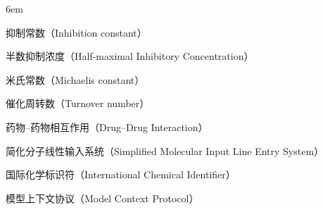 \begin{notation}
\begin{notationlist}{6em}
    \item[$K_i$] 抑制常数（Inhibition constant）
    \item[$\mathrm{IC}_{50}$] 半数抑制浓度（Half-maximal Inhibitory Concentration）
    \item[$K_m$] 米氏常数（Michaelis constant）
    \item[$k_{\mathrm{cat}}$] 催化周转数（Turnover number）
    \item[DDI] 药物--药物相互作用（Drug--Drug Interaction）
    \item[SMILES] 简化分子线性输入系统（Simplified Molecular Input Line Entry System）
    \item[InChI] 国际化学标识符（International Chemical Identifier）
    \item[MCP] 模型上下文协议（Model Context Protocol）
  \end{notationlist}

\end{notation}
